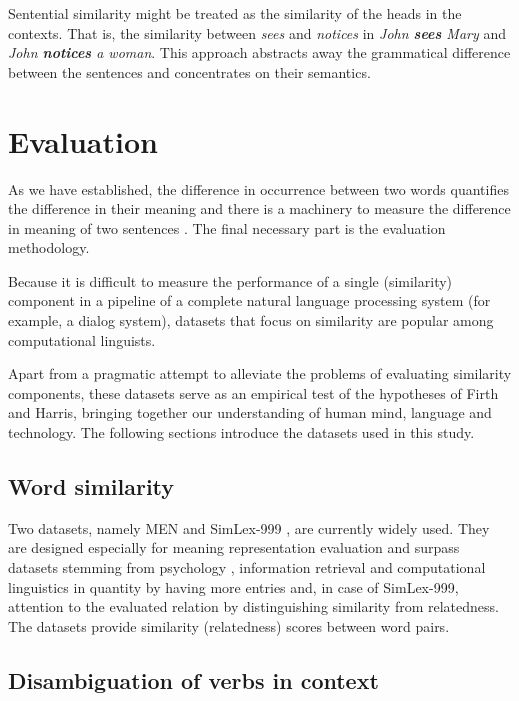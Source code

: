 Sentential similarity might be treated as the similarity of the heads in the contexts. That is, the similarity between \textit{sees} and \textit{notices} in \textit{John \textbf{sees} Mary} and \textit{John \textbf{notices} a woman}. This approach abstracts away the grammatical difference between the sentences and concentrates on their semantics.

\section{Evaluation}
\label{sec:intrinsic-evaluation}

As we have established, the difference in occurrence between two words quantifies the difference in their meaning \cite{harris1954distributional} and there is a machinery to measure the difference in meaning of two sentences \cite{DBLP:journals/corr/abs-1003-4394}. The final necessary part is the evaluation methodology.

Because it is difficult to measure the performance of a single (similarity) component in a pipeline of a complete natural language processing system (for example, a dialog system), datasets that focus on similarity are popular among computational linguists.

Apart from a pragmatic attempt to alleviate the problems of evaluating similarity components, these datasets serve as an empirical test of the hypotheses of Firth and Harris, bringing together our understanding of human mind, language and technology. The following sections introduce the datasets used in this study.

\subsection{Word similarity}
\label{sec:lexical-similarity}

Two datasets, namely MEN \cite{Bruni:2012:DST:2390524.2390544} and SimLex-999 \cite{hill2014simlex}, are currently widely used. They are designed especially for meaning representation evaluation and surpass datasets stemming from psychology \cite{1986-13502-00119860101}, information retrieval \cite{2002:PSC:503104.503110} and computational linguistics \cite{Rubenstein:1965:CCS:365628.365657} in quantity by having more entries and, in case of SimLex-999, attention to the evaluated relation by distinguishing similarity from relatedness. The datasets provide similarity (relatedness) scores between word pairs.

\subsection{Disambiguation of verbs in context}
\label{sec:disamb}

